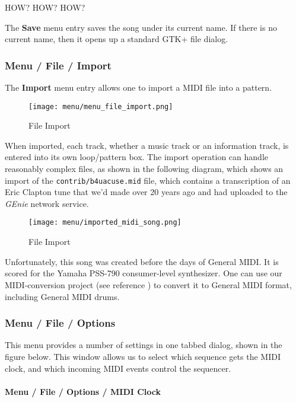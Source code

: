    HOW?  HOW?  HOW?

   The \textbf{Save} menu entry saves the song under its current name.
   If there is no current name, then
   it opens up a standard GTK+ file dialog.

\subsubsection{Menu / File / Import}
\label{subsubsec:seq24_menu_file_import}

   The \textbf{Import} menu entry allows one to import a MIDI file
   into a pattern.

\begin{figure}[H]
   \centering 
   \texttt{[image: menu/menu\_file\_import.png]}
   \caption{File Import}
   \label{fig:seq24_menu_file_import}
\end{figure}

   When imported, each track, whether a music track or an information track,
   is entered into its own loop/pattern box.  The import operation can
   handle reasonably complex files, as shown in the following diagram, which
   shows an import of the \texttt{contrib/b4uacuse.mid} file, which contains
   a transcription of an Eric Clapton tune that we'd made over 20 
   years ago and had uploaded to the \textsl{GEnie} network service.

\begin{figure}[H]
   \centering 
   \texttt{[image: menu/imported\_midi\_song.png]}
   \caption{File Import}
   \label{fig:seq24_imported_midi_song}
\end{figure}

   Unfortunately, this song was created before the days of General MIDI.
   It is scored for the Yamaha PSS-790 consumer-level synthesizer.
   One can use our MIDI-conversion project (see reference \cite{midicvt}) 
   to convert it to General MIDI format, including General MIDI drums.

\subsubsection{Menu / File / Options}
\label{subsubsec:seq24_menu_file_options}

   This menu provides a number of settings in one tabbed dialog, shown in
   the figure below.
   This window allows us to select which sequence gets the MIDI
   clock, and which incoming MIDI events control the sequencer.

\paragraph{Menu / File / Options / MIDI Clock}
\label{paragraph:seq24_menu_file_options_midi_clock}

